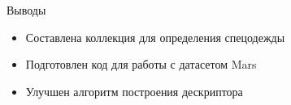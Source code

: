 \documentclass[14pt,mathserif,aspectratio=43,unicode]{beamer}
\begin{document}
\begin{frame}{Выводы}

    \begin{itemize}
        \item Составлена коллекция для определения спецодежды
        \item Подготовлен код для работы с датасетом Mars
        \item Улучшен алгоритм построения дескриптора
    \end{itemize}
    
\end{frame}

\end{document}
